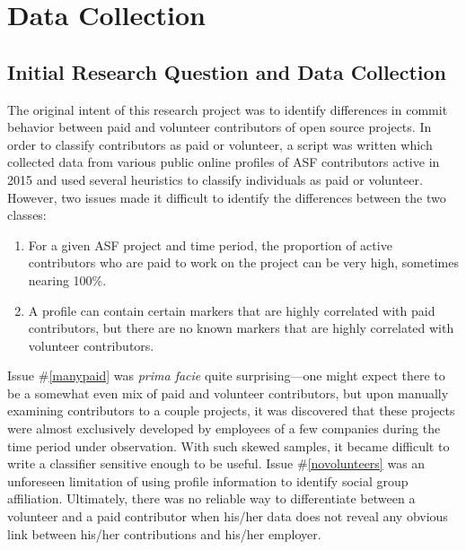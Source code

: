 \chapter{Data Collection}

\section{Initial Research Question and Data Collection}

The original intent of this research project was to identify differences in commit behavior between paid and volunteer contributors of open source projects. In order to classify contributors as paid or volunteer, a script was written which collected data from various public online profiles of ASF contributors active in 2015 and used several heuristics to classify individuals as paid or volunteer. 
However, two issues made it difficult to identify the differences between the two classes:
\begin{enumerate}
	\item \label{manypaid} For a given ASF project and time period, the proportion of active contributors who are paid to work on the project can be very high, sometimes nearing 100\%.
	\item \label{novolunteers} A profile can contain certain markers that are highly correlated with paid contributors, but there are no known markers that are highly correlated with volunteer contributors.
\end{enumerate}
Issue \#\ref{manypaid} was \emph{prima facie} quite surprising---one might expect there to be a somewhat even mix of paid and volunteer contributors, but upon manually examining contributors to a couple projects, it was discovered that these projects were almost exclusively developed by employees of a few companies during the time period under observation. With such skewed samples, it became difficult to write a classifier sensitive enough to be useful.
Issue \#\ref{novolunteers} was an unforeseen limitation of using profile information to identify social group affiliation. Ultimately, there was no reliable way to differentiate between a volunteer and a paid contributor when his/her data does not reveal any obvious link between his/her contributions and his/her employer.

